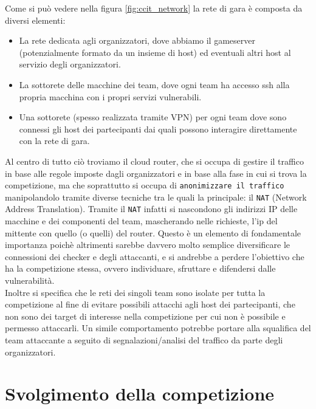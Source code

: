 Come si può vedere nella figura \ref{fig:ccit_network} la rete di gara è composta da diversi elementi:
\begin{itemize}
    \setlength{\itemsep}{5pt}
    \setlength{\parskip}{5pt}
    \item La rete dedicata agli organizzatori, dove abbiamo il gameserver (potenzialmente formato da un insieme di host) ed eventuali altri host al servizio degli organizzatori.
    \item La sottorete delle macchine dei team, dove ogni team ha accesso ssh alla propria macchina con i propri servizi vulnerabili.
    \item Una sottorete (spesso realizzata tramite VPN) per ogni team dove sono connessi gli host dei partecipanti dai quali possono interagire direttamente con la rete di gara.
\end{itemize}

Al centro di tutto ciò troviamo il cloud router, che si occupa di gestire il traffico in base alle regole imposte dagli organizzatori e in base alla fase in cui si trova la competizione,
ma che soprattutto si occupa di \texttt{anonimizzare il traffico} manipolandolo tramite diverse tecniche tra le quali la principale: il \texttt{NAT} (Network Address Translation).
Tramite il \texttt{NAT} infatti si nascondono gli indirizzi IP delle macchine e dei componenti del team, mascherando nelle richieste, l'ip del mittente con quello (o quelli) del router.
Questo è un elemento di fondamentale importanza poichè altrimenti sarebbe davvero molto semplice diversificare le connessioni dei checker e degli attaccanti, e si andrebbe a perdere l'obiettivo che ha
la competizione stessa, ovvero individuare, sfruttare e difendersi dalle vulnerabilità.\\

Inoltre si specifica che le reti dei singoli team sono isolate per tutta la competizione al fine di evitare possibili attacchi agli host dei partecipanti,
che non sono dei target di interesse nella competizione per cui non è possibile e permesso attaccarli.
Un simile comportamento potrebbe portare alla squalifica del team attaccante a seguito di segnalazioni/analisi del traffico da parte degli organizzatori.

\section{Svolgimento della competizione}


